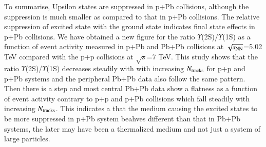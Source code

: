 To summarise, Upsilon states are suppressed in p+Pb collisions, although
the suppression is much smaller as compared to that in p+Pb collisions.
The relative suppression of excited state with the ground state indicates final
state effects in p+Pb collisions. 
We have obtained a new figure for the ratio $\Upsilon$(2S)/$\Upsilon$(1S)
as a function of event activity measured in p+Pb and Pb+Pb collisions at
$\sqrt{s_{\rm NN}}$=5.02 TeV compared with the 
p+p collisions at $\sqrt{s}$=7 TeV. This study shows 
that the ratio $\Upsilon$(2S)/$\Upsilon$(1S) decreases steadily
with with increasing $N_{\rm tracks}$ for
p+p and p+Pb systems and the peripheral Pb+Pb data also follow the same pattern.
Then there is a step and most central Pb+Pb
data show a flatness as a function of event activity contrary to p+p and
p+Pb collisions which fall steadily with increasing $N_{\rm tracks}$.
This indicates a that the medium causing the excited states to be more suppressed
in p+Pb system beahves different than that in Pb+Pb systems, the later may have
been a thermalized medium and not just a system of large particles.



  

